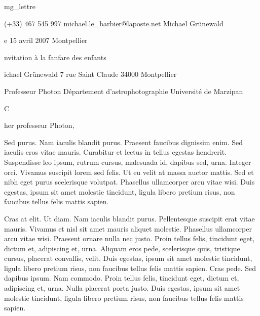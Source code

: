 


\class mg_lettre

%
%



\phone          (+33) 467 545 997
\email          michael.le\_barbier@laposte.net
\name           Michael Grünewald
\date           le 15 avril 2007
\place          Montpellier
\subject        Invitation à la fanfare des enfants


\address
Michael Grünewald
7 rue Saint Claude
34000 Montpellier

\addressee
Professeur Photon
Département d'astrophotographie
Université de Marzipan

%
%


\opening        Cher professeur Photon,

Sed purus. Nam iaculis blandit purus. Praesent faucibus dignissim
enim. Sed iaculis eros vitae mauris. Curabitur et lectus in tellus
egestas hendrerit. Suspendisse leo ipsum, rutrum cursus, malesuada id,
dapibus sed, urna. Integer orci. Vivamus suscipit lorem sed felis. Ut
eu velit at massa auctor mattis. Sed et nibh eget purus scelerisque
volutpat. Phasellus ullamcorper arcu vitae wisi. Duis egestas, ipsum
sit amet molestie tincidunt, ligula libero pretium risus, non faucibus
tellus felis mattis sapien.

Cras at elit. Ut diam. Nam iaculis blandit purus. Pellentesque
suscipit erat vitae mauris. Vivamus et nisl sit amet mauris aliquet
molestie. Phasellus ullamcorper arcu vitae wisi. Praesent ornare nulla
nec justo. Proin tellus felis, tincidunt eget, dictum et, adipiscing
et, urna. Aliquam eros pede, scelerisque quis, tristique cursus,
placerat convallis, velit. Duis egestas, ipsum sit amet molestie
tincidunt, ligula libero pretium risus, non faucibus tellus felis
mattis sapien. Cras pede. Sed dapibus ipsum. Nam commodo. Proin tellus
felis, tincidunt eget, dictum et, adipiscing et, urna. Nulla placerat
porta justo. Duis egestas, ipsum sit amet molestie tincidunt, ligula
libero pretium risus, non faucibus tellus felis mattis sapien.

